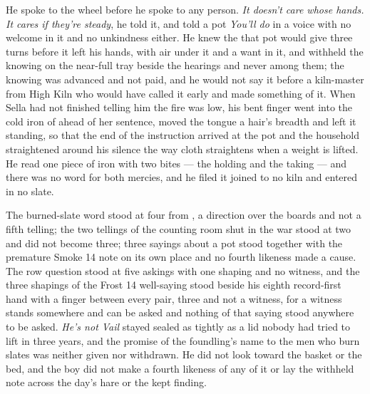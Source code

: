 He spoke to the wheel before he spoke to any person. \emph{It doesn't care whose hands. It cares if they're steady}, he told it, and told a pot \emph{You'll do} in a voice with no welcome in it and no unkindness either. He knew the  that pot would give three turns before it left his hands, with air under it and a want in it, and withheld the knowing on the near-full tray beside the hearings and never among them; the knowing was advanced and not paid, and he would not say it before a kiln-master from High Kiln who would have called it early and made something of it. When Sella had not finished telling him the fire was low, his bent finger went into the cold iron of  ahead of her sentence, moved the tongue a hair's breadth and left it standing, so that the end of the instruction arrived at the pot and the household straightened around his silence the way cloth straightens when a weight is lifted. He read one piece of iron with two bites --- the holding and the taking --- and there was no  word for both mercies, and he filed it joined to no kiln and entered in no slate.

The burned-slate word stood at four from , a direction over the boards and not a fifth telling; the two tellings of the counting room shut in the war stood at two and did not become three; three sayings about a pot stood together with the premature Smoke 14 note on its own place and no fourth likeness made a cause. The row question stood at five askings with one shaping and no witness, and the three shapings of the Frost 14 well-saying stood beside his eighth record-first hand with a finger between every pair, three and not a witness, for a witness stands somewhere and can be asked and nothing of that saying stood anywhere to be asked. \emph{He's not Vail} stayed sealed as tightly as a lid nobody had tried to lift in three years, and the promise of the foundling's name to the men who burn slates was neither given nor withdrawn. He did not look toward the basket or the bed, and the boy did not make a fourth likeness of any of it or lay the withheld note across the day's hare or the kept finding.

\scenebreak

